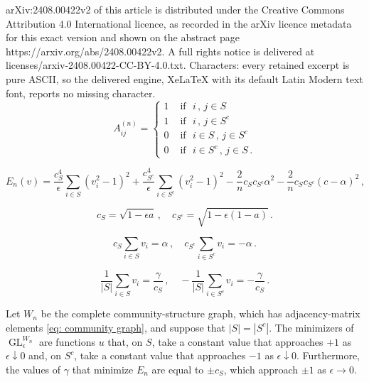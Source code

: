 \documentclass[10pt,a4paper]{amsart}
\def\GL{\operatorname{GL}}
\def\ep{\epsilon}
\def\ra{\rightarrow}
\begin{document}
arXiv:2408.00422v2 of this article is distributed under the Creative Commons Attribution 4.0 International licence, as recorded in the arXiv licence metadata for this exact version and shown on the abstract page https://arxiv.org/abs/2408.00422v2. A full rights notice is delivered at licenses/arxiv-2408.00422-CC-BY-4.0.txt. Characters: every retained excerpt is pure ASCII, so the delivered engine, XeLaTeX with its default Latin Modern text font, reports no missing character.
\begin{equation}\label{eq: community graph}
    A^{(n)}_{ij} = \begin{cases}
        1 &\text{ if }\,\, i\,, \,j \in S
        \\
        1 &\text{ if } \,\,i\,, \,j \in S^c
        \\
        0 &\text{ if } \,\,i \in S\,,\,  j\in S^c
        \\
        0 &\text{ if } \,\,i \in S^c\,,\,  j \in S \,. 
    \end{cases}
\end{equation}

\begin{equation}\label{eq: equivalent community fnl}
    E_n(v) =  \frac{c_S^4}{\ep} \sum_{i\in S} (v_i^2 - 1)^2 + \frac{c_{S^c}^4}{\ep} \sum_{i\in S^c} (v_i^2 - 1)^2 - \frac{2}{n} c_S c_{S^c} \alpha^2 - \frac{2}{n}c_S c_{S^c}(c - \alpha)^2 \,,
\end{equation}

\begin{equation}\label{eq: communities scaling}
    c_S = \sqrt{1 - \ep a} \,, \quad  c_{S^c} = \sqrt{1 - \ep(1 - a)} \,. 
\end{equation}

\begin{equation}\label{eq: vol constraint community}
    c_S \sum_{i\in S} v_i = \alpha \,, \quad c_{S^c} \sum_{i\in S^c} v_i = -\alpha \,.
\end{equation}

\begin{equation}\label{eq: equal community vol constraint}
    \frac{1}{|S|} \sum_{i\in S} v_i = \frac{\gamma}{c_S}\,, \quad  -\frac{1}{|S|} \sum_{i\in S^c} v_i = -\frac{\gamma}{c_S}\,.
\end{equation}

\begin{proposition} \label{prop: community structure minimizers}
Let $W_n$ be the complete community-structure graph, which has adjacency-matrix elements \eqref{eq: community graph}, and suppose that $|S| = |S^c|$. 
The minimizers of $\GL^{W_n}_\ep$ are functions $u$ that, on $S$, take a constant value that approaches $+1$ as $\ep \downarrow 0$ and, on $S^c$, take a constant value that approaches $-1$ as $\ep \downarrow 0$. Furthermore, the values of $\gamma$ that minimize $E_n$ {are equal to} $\pm c_S$, which approach $\pm 1$ as $\ep \ra 0$.
\end{proposition}
\end{document}
